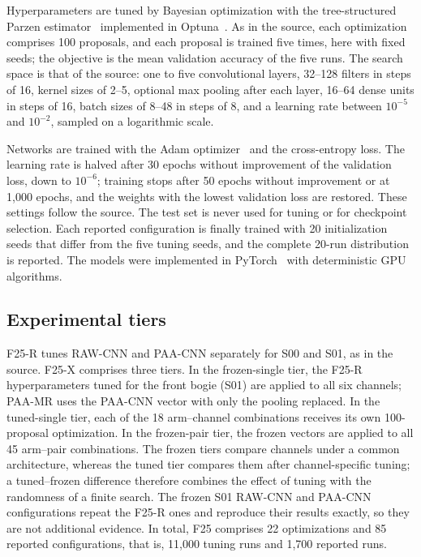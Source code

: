Hyperparameters are tuned by Bayesian optimization with the tree-structured
Parzen estimator~\cite{bergstra2011algorithms} implemented in
Optuna~\cite{akiba2019optuna}. As in the source, each optimization comprises
100 proposals, and each proposal is trained five times, here with fixed seeds;
the objective is the mean validation accuracy of the five runs. The search space
is that of the source: one to five convolutional layers, 32--128 filters in
steps of 16, kernel sizes of 2--5, optional max pooling after each layer, 16--64
dense units in steps of 16, batch sizes of 8--48 in steps of 8, and a learning
rate between $10^{-5}$ and $10^{-2}$, sampled on a logarithmic scale.

Networks are trained with the Adam optimizer~\cite{kingma2015adam} and the
cross-entropy loss. The learning rate is halved after 30 epochs without
improvement of the validation loss, down to $10^{-6}$; training stops after 50
epochs without improvement or at 1,000 epochs, and the weights with the lowest
validation loss are restored. These settings follow the source. The test set is
never used for tuning or for checkpoint selection. Each reported configuration
is finally trained with 20 initialization seeds that differ from the five
tuning seeds, and the complete 20-run distribution is reported. The models were
implemented in PyTorch~\cite{paszke2019pytorch} with deterministic GPU
algorithms.

\subsection{Experimental tiers}

F25-R tunes RAW-CNN and PAA-CNN separately for S00 and S01, as in the source.
F25-X comprises three tiers. In the frozen-single tier, the F25-R
hyperparameters tuned for the front bogie (S01) are applied to all six channels;
PAA-MR uses the PAA-CNN vector with only the pooling replaced. In the
tuned-single tier, each of the 18 arm--channel combinations receives its own
100-proposal optimization. In the frozen-pair tier, the frozen vectors are
applied to all 45 arm--pair combinations. The frozen tiers compare channels
under a common architecture, whereas the tuned tier compares them after
channel-specific tuning; a tuned--frozen difference therefore combines the
effect of tuning with the randomness of a finite search. The frozen S01 RAW-CNN
and PAA-CNN configurations repeat the F25-R ones and reproduce their results
exactly, so they are not additional evidence. In total, F25 comprises 22
optimizations and 85 reported configurations, that is, 11,000 tuning runs and
1,700 reported runs.

